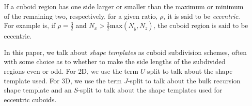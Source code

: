 If a cuboid region has one side larger or smaller than the maximum or minimum of the remaining two, respectively,
for a given ratio, $\rho$, it is said to be \textit{eccentric}. %
For example is, if $\rho=\frac{3}{2}$ and $N _ x > \frac{3}{2} \text{max}(N_y, N_z)$, the cuboid region is said to be eccentric.

In this paper, we talk about \textit{shape templates} as cuboid subdivision schemes, often with some choice as to whether
to make the side lengths of the subdivided regions even or odd.
For 2D, we use the term $U$-split to talk about the shape template used.
For 3D, we use the term $J$-split to talk about the bulk recursion shape template and an $S$-split to
talk about the shape templates used for eccentric cuboids.


